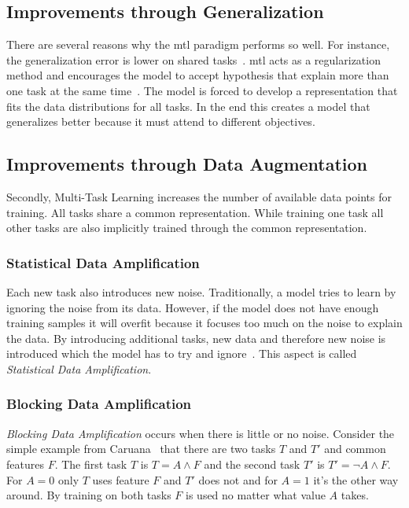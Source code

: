 \subsection{Improvements through Generalization}
\label{sec:03_mtlAdvantages}

There are several reasons why the \gls{mtl} paradigm performs so well. For instance, the generalization error is lower on shared tasks~\cite{Caruana1993}. \gls{mtl} acts as a regularization method and encourages the model to accept hypothesis that explain more than one task at the same time~\cite{Ruder2017}. The model is forced to develop a representation that fits the data distributions for all tasks. In the end this creates a model that generalizes better because it must attend to different objectives.

\subsection{Improvements through Data Augmentation}

Secondly, Multi-Task Learning increases the number of available data points for training. All tasks share a common representation. While training one task all other tasks are also implicitly trained through the common representation.

\subsubsection*{Statistical Data Amplification}

Each new task also introduces new noise. Traditionally, a model tries to learn by ignoring the noise from its data. However, if the model does not have enough training samples it will overfit because it focuses too much on the noise to explain the data. By introducing additional tasks, new data and therefore new noise is introduced which the model has to try and ignore~\cite{Ruder2017}. This aspect is called \textit{Statistical Data Amplification}\cite{Caruana1995a}.

\subsubsection*{Blocking Data Amplification}

\textit{Blocking Data Amplification} occurs when there is little or no noise. Consider the simple example from Caruana~\cite{Caruana1995a} that there are two tasks $T$ and $T'$ and common features $F$. The first task $T$ is $T = A \land F $ and the second task $T'$ is $T' = \neg A \land F$. For $A=0$ only $T$ uses feature $F$ and $T'$ does not and for $A=1$ it's the other way around. By training on both tasks $F$ is used no matter what value $A$ takes. 

